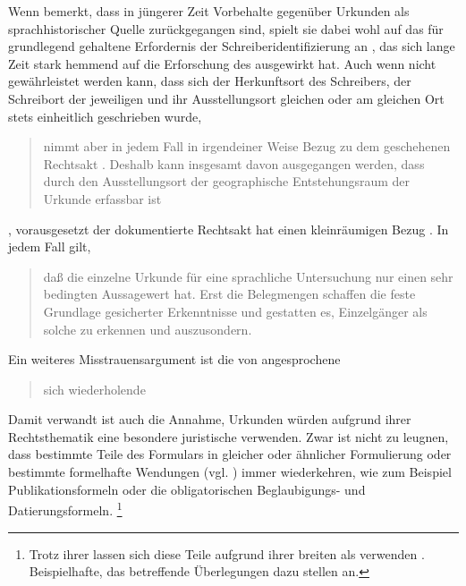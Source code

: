Wenn \citet[21--22]{schulze2011} bemerkt, dass in jüngerer Zeit
Vorbehalte gegenüber Urkunden als sprachhistorischer
Quelle zurückgegangen sind, spielt sie dabei wohl auf das für grundlegend
gehaltene Erfordernis der
Schreiberidentifizierung an
\autocites%
	[23--33]{boesch1946}%
	[389]{haacke1955}%
	[\RN{29}--\RN{35}]{deboorhaacke1957}, das sich lange Zeit stark hemmend auf
die Erforschung des \CAO{} ausgewirkt hat. Auch wenn nicht gewährleistet werden
kann, dass sich der Herkunftsort des Schreibers,
der Schreibort der jeweiligen  und ihr Ausstellungsort gleichen
oder am gleichen Ort stets einheitlich geschrieben wurde,
\blockcquote[331--332]{ganslmayeretal2003}{nimmt 
aber in jedem Fall in irgendeiner Weise Bezug zu dem geschehenen Rechtsakt
\textelp{}. Deshalb kann insgesamt davon ausgegangen werden, dass durch den
Ausstellungsort der geographische Entstehungsraum der
Urkunde erfassbar ist}, vorausgesetzt der dokumentierte Rechtsakt hat einen
kleinräumigen Bezug \autocite[vergleiche auch][\RN{29}]{deboorhaacke1957}. In
jedem Fall gilt, \blockcquote[122]{deboor1974}{daß die einzelne Urkunde für
eine sprachliche Untersuchung nur einen sehr bedingten Aussagewert hat. Erst
die Belegmengen schaffen die feste Grundlage gesicherter Erkenntnisse und
gestatten es, Einzelgänger als solche zu erkennen und auszusondern.}

Ein weiteres Misstrauensargument ist die von
\citet[1311]{wegera2000} angesprochene \blockquote{sich wiederholende
}. Damit verwandt ist auch die Annahme,
Urkunden würden aufgrund ihrer Rechtsthematik eine besondere
juristische  verwenden. Zwar ist nicht zu leugnen, dass
bestimmte Teile des Formulars in gleicher oder ähnlicher Formulierung oder
bestimmte formelhafte Wendungen (vgl. ) immer
wiederkehren, wie zum Beispiel Publikationsformeln
oder die obligatorischen Beglaubigungs- und Datierungsformeln.%
%
	\footnote{%
	Trotz ihrer  lassen sich diese Teile aufgrund ihrer
	breiten  als  verwenden
	\autocite[siehe][]{cysouwwaelchli2007}. Beispielhafte, das \CAO{}
	betreffende Überlegungen dazu stellen
	\citet[174--175]{beckerschallert2022b} an.}

